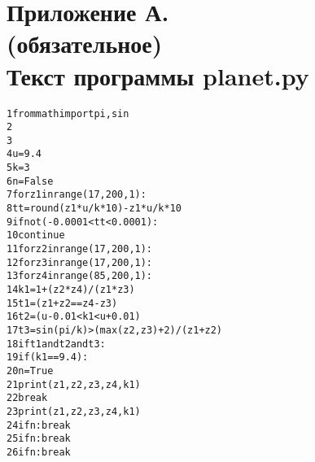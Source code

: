 \section*{Приложение А. \\
	(обязательное) \\
	Текст программы planet.py}

\begin{alltt}
1  from math import pi, sin
2  
3  
4  u = 9.4
5  k = 3
6  n = False
7  for z1 in range(17, 200, 1):
8      tt = round(z1 * u / k * 10) - z1 * u / k * 10
9      if not (-0.0001 < tt < 0.0001):
10          continue
11     for z2 in range(17, 200, 1):
12         for z3 in range(17, 200, 1):
13             for z4 in range(85, 200, 1):
14                 k1 = 1 + (z2 * z4) / (z1 * z3)
15                 t1 = (z1 + z2 == z4 - z3)
16                 t2 = (u - 0.01 < k1 < u + 0.01)
17                 t3 = sin(pi / k) > (max(z2, z3) + 2) / (z1 + z2)
18                 if t1 and t2 and t3:
19                     if (k1 == 9.4):
20                         n = True
21                         print(z1, z2, z3, z4, k1)
22                         break
23                     print(z1, z2, z3, z4, k1)
24              if n: break
25        if n: break
26     if n: break
\end{alltt}

\label{final_page}